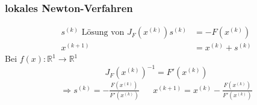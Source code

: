 \documentclass[
ngerman,
accentcolor=9c,%
type=intern,
marginpar=false
]{tudapub}
\begin{document}
            \subsubsection{lokales Newton-Verfahren}
                \begin{align*}
                    s^{(k)} \text{ Lösung von } J_F(x^{(k)})s^{(k)} &= - F(x^{(k)})\\
                    x^{(k+1)} &= x^{(k)} + s^{(k)}
                \end{align*}
                Bei $f(x) : \mathbb{R}^1\rightarrow\mathbb{R}^1$
                \begin{equation*}
                    J_{F}(x^{(k)})^{-1} = F'(x^{(k)})
                \end{equation*}
                \begin{align*}
                    \Rightarrow s^{(k)} = - \frac{F(x^{(k)})}{F'(x^{(k)})} &&
                    x^{(k+1)} = x^{(k)} - \frac{F(x^{(k)})}{F'(x^{(k)})}
                \end{align*}
    \newpage
\end{document}
